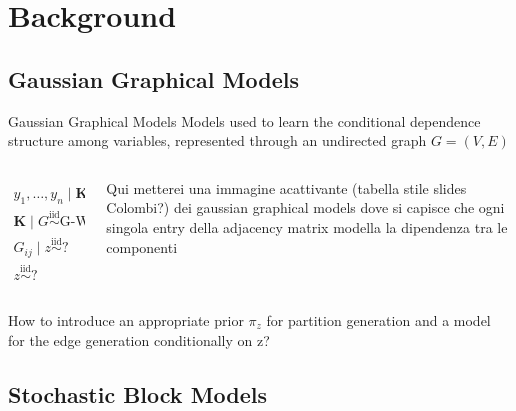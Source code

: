

\section{Background}

\subsection{Gaussian Graphical Models}
\begin{frame}{Gaussian Graphical Models}
    Models used to learn the \alert{conditional dependence structure} among variables, represented through an undirected graph $G=(V,E)$
\begin{columns}
\begin{column}{0.5\textwidth}

\newcommand{\iid}{\overset{\mathrm{iid}}{\sim}}

\centering
\begin{align*}
    y_{1}, \ldots, y_{n} \mid \mathbf{K} \iid \mathcal{N}_{p}(0,\mathbf{K}), \mathbf{K}=\Sigma^{-1}\\ 
    \mathbf{K} \mid G \iid \text{G-Wishart}(B,d) ,  K \in \mathbb{R}^{p\times p}\\
    G_{ij} \mid z \iid ?\\ 
    z \iid ?
\end{align*}
\end{column}

\begin{column}{0.5\textwidth}
Qui metterei una immagine acattivante (tabella stile slides Colombi?) dei gaussian graphical models dove si capisce che ogni singola entry della adjacency matrix modella la dipendenza tra le componenti
\end{column}

\end{columns}
\centering
How to introduce an appropriate prior $\pi_{z}$ for \alert{partition generation} and a model for the \alert{edge generation} conditionally on z? 
\end{frame}











\subsection{Stochastic Block Models}

